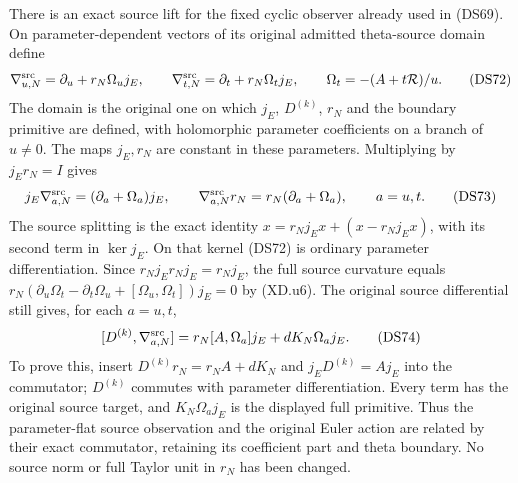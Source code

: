 There is an exact source lift for the fixed cyclic observer already
used in (DS69).  On parameter-dependent vectors of its original
admitted theta-source domain define
\[
 \nabla_{u,N}^{\rm src}=\partial_u+r_N\Omega_u j_E,
 \qquad \nabla_{t,N}^{\rm src}=\partial_t+r_N\Omega_t j_E,
 \qquad\Omega_t=-(A+t\mathcal R)/u.                  \tag{DS72}
\]
The domain is the original one on which $j_E$, $D^{(k)}$, $r_N$ and
the boundary primitive are defined, with holomorphic parameter
coefficients on a branch of $u\ne0$.  The maps $j_E,r_N$ are
constant in these parameters.  Multiplying by $j_Er_N=I$ gives
\[
 j_E\nabla_{a,N}^{\rm src}=(\partial_a+\Omega_a)j_E,
 \qquad\nabla_{a,N}^{\rm src}r_N=r_N(\partial_a+\Omega_a),
 \qquad a=u,t.                                      \tag{DS73}
\]
The source splitting is the exact identity
$x=r_Nj_Ex+(x-r_Nj_Ex)$, with its second term in $\ker j_E$.
On that kernel (DS72) is ordinary parameter differentiation.
Since $r_Nj_Er_Nj_E=r_Nj_E$, the full source curvature equals
$r_N(\partial_u\Omega_t-\partial_t\Omega_u+
[\Omega_u,\Omega_t])j_E=0$ by (XD.u6).
The original source differential still gives, for each $a=u,t$,
\[
 [D^{(k)},\nabla_{a,N}^{\rm src}]
   =r_N[A,\Omega_a]j_E+dK_N\Omega_a j_E.             \tag{DS74}
\]
To prove this, insert $D^{(k)}r_N=r_NA+dK_N$ and
$j_ED^{(k)}=Aj_E$ into the commutator; $D^{(k)}$ commutes with
parameter differentiation.  Every term has the original source
target, and $K_N\Omega_a j_E$ is the displayed full primitive.
Thus the parameter-flat source observation and the original Euler
action are related by their exact commutator, retaining its
coefficient part and theta boundary.  No source norm or full Taylor
unit in $r_N$ has been changed.

